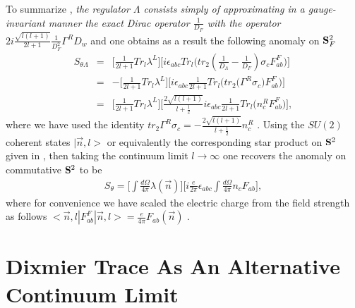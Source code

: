\documentclass[a4paper,10pt]{article}
\begin{document}
To summarize , {\it the regulator ${\Lambda}$ consists simply of
approximating in a gauge-invariant manner the exact Dirac operator
$\frac{1}{D_F}$ with the operator $
2i\frac{\sqrt{l(l+1)}}{2l+1}\frac{1}{D_F^2}{\Gamma}^RD_{w}$} and
one obtains as a result the following anomaly on ${\bf S}^2_F$
\begin{eqnarray}
S_{\theta \Lambda}&=&\bigg[\frac{1}{2l+1}Tr_l{\lambda}^{L}\bigg]\bigg[i{\epsilon}_{abc}Tr_{l}\bigg(tr_2(\frac{1}{D_{\Lambda}}-\frac{1}{D_{F}}){\sigma}_cF_{ab}^F\bigg)\bigg]\nonumber\\
&=&-\bigg[\frac{1}{2l+1}Tr_l{\lambda}^{L}\bigg]\bigg[i{\epsilon}_{abc}\frac{1}{2l+1}Tr_{l}\bigg(tr_2\big({\Gamma}^R{\sigma}_c\big)F_{ab}^F\bigg)\bigg]\nonumber\\
&=&\bigg[\frac{1}{2l+1}Tr_l{\lambda}^{L}\bigg]\bigg[\frac{2\sqrt{l(l+1)}}{l+\frac{1}{2}}i{\epsilon}_{abc}
\frac{1}{2l+1}Tr_{l}\bigg(n_c^RF_{ab}^F\bigg)\bigg],
\end{eqnarray}
where we have used the identity
$tr_2{\Gamma}^R{\sigma}_c=-\frac{2\sqrt{l(l+1)}}{l+\frac{1}{2}}n_c^R$
. Using the $SU(2)$ coherent states $|\vec{n},l>$ or equivalently
the corresponding star product on ${\bf S}^2$ given in
\cite{lee,ref21} , then taking the continuum limit
$l{\longrightarrow}{\infty}$ one recovers the anomaly on
commutative ${\bf S}^2$ to be
\begin{eqnarray}
S_{\theta }=\bigg[\int
\frac{d{\Omega}}{4{\pi}}{\lambda}(\vec{n})\bigg]\bigg[i\frac{e}{2{\pi}}{\epsilon}_{abc}\int
\frac{d{\Omega}}{4{\pi}}n_cF_{ab}\bigg],\label{FA}
\end{eqnarray}
where for convenience we have scaled the electric charge from the
field strength as follows
$<\vec{n},l|F_{ab}^F|\vec{n},l>=\frac{e}{4{\pi}}F_{ab}(\vec{n})$ .



\section{Dixmier Trace As An Alternative Continuum Limit}
\end{document}
